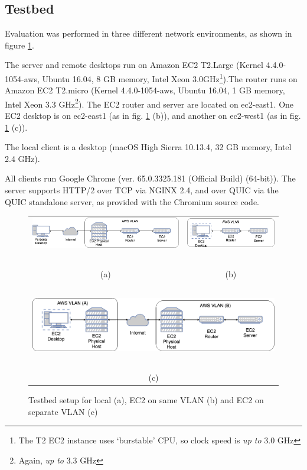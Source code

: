\documentclass[12pt]{article}
\begin{document}
\subsection{Testbed}
Evaluation was performed in three different network environments, as shown in figure \ref{fig:network}.

The server and remote desktops run on Amazon EC2 T2.Large (Kernel 4.4.0-1054-aws, Ubuntu 16.04, 8 GB memory, Intel Xeon 3.0GHz\footnote{The T2 EC2 instance uses `burstable' CPU, so clock speed is \emph{up to} 3.0 GHz}).The router runs on Amazon EC2 T2.micro (Kernel 4.4.0-1054-aws, Ubuntu 16.04, 1 GB memory, Intel Xeon 3.3 GHz\footnote{Again, \emph{up to} 3.3 GHz}). The EC2 router and server are located on ec2-east1. One EC2 desktop is on ec2-east1 (as in fig. \ref{fig:network} (b)), and another on ec2-west1 (as in fig. \ref{fig:network} (c)).

The local client is a desktop (macOS High Sierra 10.13.4, 32 GB memory, Intel 2.4 GHz).

All clients run Google Chrome (ver. 65.0.3325.181 (Official Build) (64-bit)). The server supports HTTP/2 over TCP via NGINX 2.4, and over QUIC via the QUIC standalone server, as provided with the Chromium source code.

\begin{figure}
\begin{tabular}{c c}
\includegraphics[scale=.25]{images/local.png} & \includegraphics[scale=.25]{images/aws.png}\\
~ & ~ \\
(a) & (b) \\
~ & ~ \\
\multicolumn{2}{c}{\includegraphics[scale=.25]{images/aws_inet.png}} \\
~ & ~ \\
\multicolumn{2}{c}{(c)} \\
\end{tabular}
\caption{Testbed setup for local (a), EC2 on same VLAN (b) and EC2 on separate VLAN (c)}
\label{fig:network}
\end{figure}
\end{document}
